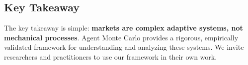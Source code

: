 \subsection{Key Takeaway}

The key takeaway is simple: \textbf{markets are complex adaptive systems, not mechanical processes}. Agent Monte Carlo provides a rigorous, empirically validated framework for understanding and analyzing these systems. We invite researchers and practitioners to use our framework in their own work.

